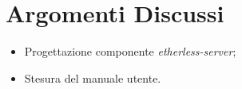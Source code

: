 \section{Argomenti Discussi}
	\begin{itemize}
		\item Progettazione componente \textit{etherless-server};
		\item Stesura del manuale utente.
	\end{itemize}